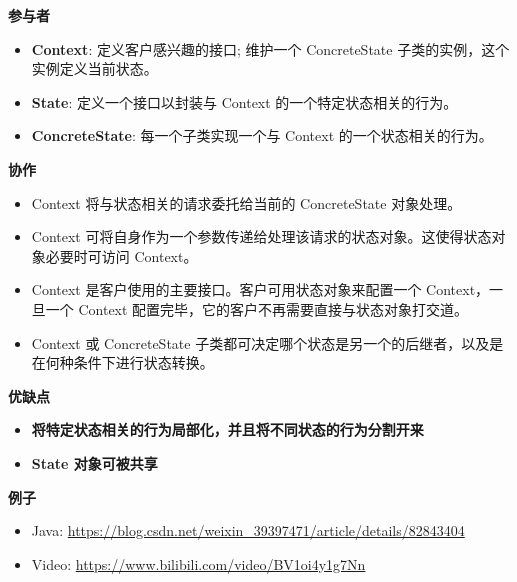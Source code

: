 \noindent\textbf{参与者}

\begin{itemize}
    \item \textbf{Context}: 定义客户感兴趣的接口; 维护一个 ConcreteState 子类的实例，这个实例定义当前状态。
    \item \textbf{State}: 定义一个接口以封装与 Context 的一个特定状态相关的行为。
    \item \textbf{ConcreteState}: 每一个子类实现一个与 Context 的一个状态相关的行为。
\end{itemize}

\noindent\textbf{协作}

\begin{itemize}
    \item Context 将与状态相关的请求委托给当前的 ConcreteState 对象处理。
    \item Context 可将自身作为一个参数传递给处理该请求的状态对象。这使得状态对象必要时可访问 Context。
    \item Context 是客户使用的主要接口。客户可用状态对象来配置一个 Context，一旦一个 Context 配置完毕，它的客户不再需要直接与状态对象打交道。
    \item Context 或 ConcreteState 子类都可决定哪个状态是另一个的后继者，以及是在何种条件下进行状态转换。
\end{itemize}

\noindent\textbf{优缺点}

\begin{itemize}
    \item \textbf{将特定状态相关的行为局部化，并且将不同状态的行为分割开来}
    \item \textbf{State 对象可被共享}
\end{itemize}

\noindent\textbf{例子}

\begin{itemize}
    \item Java: \url{https://blog.csdn.net/weixin_39397471/article/details/82843404}
    \item Video: \url{https://www.bilibili.com/video/BV1oi4y1g7Nn}
\end{itemize}



\newpage
